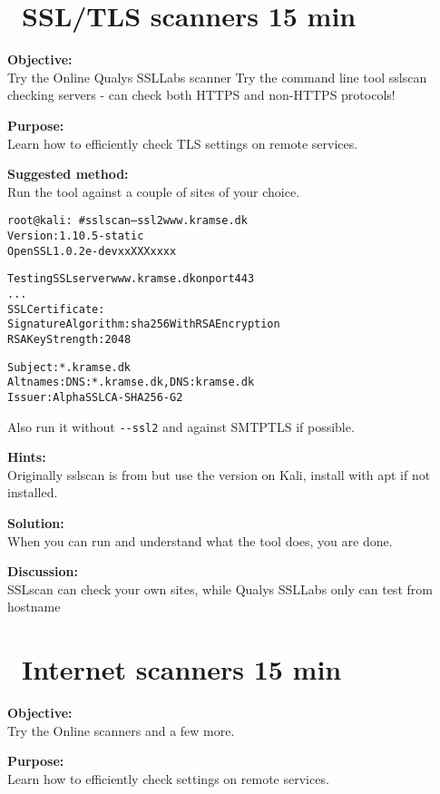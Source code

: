 \documentclass[a4paper,11pt,notitlepage]{report}
\begin{document}
\chapter{\faExclamationTriangle\ SSL/TLS scanners 15 min}
\label{ex:SSLScanner}

{\bf Objective:}\\
Try the Online Qualys SSLLabs scanner 
Try the command line tool sslscan checking servers - can check both HTTPS and non-HTTPS protocols!

{\bf Purpose:}\\
Learn how to efficiently check TLS settings on remote services.

{\bf Suggested method:}\\
Run the tool against a couple of sites of your choice.

\begin{alltt}\small
root@kali:~# sslscan --ssl2 www.kramse.dk
Version: 1.10.5-static
OpenSSL 1.0.2e-dev xx XXX xxxx

Testing SSL server www.kramse.dk on port 443
...
  SSL Certificate:
Signature Algorithm: sha256WithRSAEncryption
RSA Key Strength:    2048

Subject:  *.kramse.dk
Altnames: DNS:*.kramse.dk, DNS:kramse.dk
Issuer:   AlphaSSL CA - SHA256 - G2
\end{alltt}

Also run it without \verb+--ssl2+ and against SMTPTLS if possible.

{\bf Hints:}\\
Originally sslscan is from  but use the version on Kali, install with apt if not installed.

{\bf Solution:}\\
When you can run and understand what the tool does, you are done.

{\bf Discussion:}\\
SSLscan can check your own sites, while Qualys SSLLabs only can test from hostname


\chapter{\faExclamationTriangle\ Internet scanners 15 min}
\label{ex:web-site-check}

{\bf Objective:}\\
Try the Online scanners  and a few more.

{\bf Purpose:}\\
Learn how to efficiently check settings on remote services.
\end{document}
